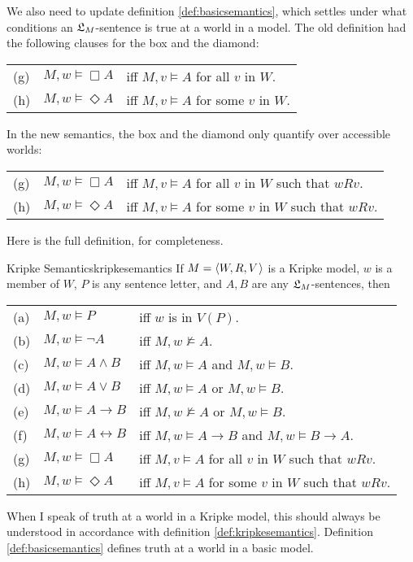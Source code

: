 We also need to update definition \ref{def:basicsemantics}, which settles under
what conditions an $\mathfrak{L}_M$-sentence is true at a world in a model. The old
definition had the following clauses for the box and the diamond:

\bigskip
\begin{tabular}{lll}
  (g) & $M,w \models \Box A$ &iff $M,v \models A$ for all $v$ in $ W$.\\
  (h) & $M,w \models \Diamond A$ &iff $M,v \models A$ for some $v$ in $ W$.
\end{tabular}
\bigskip

\noindent%
In the new semantics, the box and the diamond only quantify over
accessible worlds:

\bigskip
\begin{tabular}{lll}
  (g) & $M,w \models \Box A$ &iff $M,v \models A$ for all $v$ in $ W$ such that $wRv$.\\
  (h) & $M,w \models \Diamond A$ &iff $M,v \models A$ for some $v$ in $ W$ such that $wRv$.
\end{tabular}
\bigskip

Here is the full definition, for completeness.

\begin{definition}{Kripke Semantics}{kripkesemantics}
  If $\Mfr = \t{W,R,V}$ is a Kripke model, $w$ is a member of $W$, $P$ is
  any sentence letter, and $A,B$ are any $\mathfrak{L}_M$-sentences, then

  \medskip
  \begin{tabular}{lll}
    (a) & $M,w \models P$ &iff $w$ is in $V(P)$.\\
    (b) & $M,w \models \neg A$ &iff $M,w \not\models A$.\\
    (c) & $M,w \models A \land B$ &iff $M,w \models A$ and $M,w \models B$.\\
    (d) & $M,w \models A \lor B$ &iff $M,w \models A$ or $M,w \models B$.\\
    (e) & $M,w \models A \to B$ &iff $M,w \not\models A$ or $M,w \models B$.\\
    (f) & $M,w \models A \leftrightarrow B$ &iff $M,w \models A\to B$ and $M,w \models B\to A$.\\
    (g) & $M,w \models \Box A$ &iff $M,v \models A$ for all $v$ in $ W$ such that $wRv$.\\
    (h) & $M,w \models \Diamond A$ &iff $M,v \models A$ for some $v$ in $ W$ such that $wRv$.
  \end{tabular}
\end{definition}
%
When I speak of truth at a world in a Kripke model, this should always be
understood in accordance with definition \ref{def:kripkesemantics}. Definition
\ref{def:basicsemantics} defines truth at a world in a basic model.

